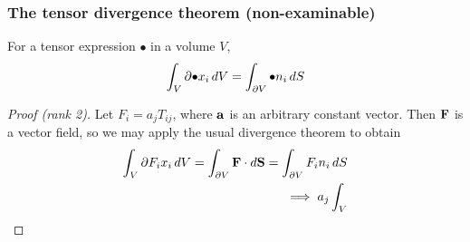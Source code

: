 \documentclass{../template/note}
\begin{document}
    \subsubsection{The tensor divergence theorem (non-examinable)}
    
    \begin{proposition*}
        For a tensor expression \(\bullet\) in a volume \(V\),
        \begin{align*}
            \int_V \partial{\bullet}{x_i} \,d{V} = \int_{\partial V} \bullet n_i \,d{S}
        \end{align*}
    \end{proposition*}
    
    \begin{proof}[Proof (rank 2)]
        Let \(F_i = a_j T_{ij}\), where \(\V a\) is an arbitrary constant vector. Then \(\V F\) is a vector field, so we may apply the usual divergence theorem to obtain
        \begin{align*}
            \int_V \pr{F_i}{x_i} \D V = \int_{\pr V} \V F \cdot d\V S = \int_{\pr V} F_i n_i \D S \\
            \implies a_j \int_V 
        \end{align*}
        
        
    \end{proof}
    
    
    
    
    

    
    
    
    
    
    
    
    
\end{document}
